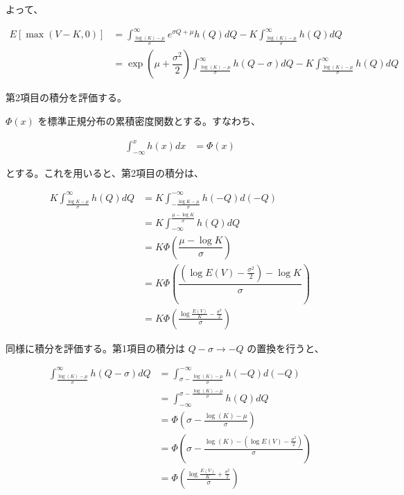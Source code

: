 \documentclass[uplatex]{jsarticle}
\begin{document}
よって、

\begin{align}
	E \left[ \max(V-K,0) \right] & = \int^{\infty}_{\frac{\log(K) - \mu}{\sigma}} e^{\sigma Q + \mu } h(Q) dQ - K \int^{\infty}_{\frac{\log(K) - \mu}{\sigma}} h(Q) dQ                          \\
	                             & = \exp( \mu + \dfrac{\sigma^{2} }{2}) \int^{\infty}_{\frac{\log(K) - \mu}{\sigma}} h(Q - \sigma) dQ - K \int^{\infty}_{\frac{\log(K) - \mu}{\sigma}} h(Q) dQ
\end{align}

第2項目の積分を評価する。

$\Phi (x)$ を標準正規分布の累積密度関数とする。すなわち、

\begin{align}
	\int^{x}_{-\infty} h(x) dx & = \Phi (x)
\end{align}

とする。これを用いると、第2項目の積分は、

\begin{align}
	K \int^{\infty}_{\frac{\log K - \mu}{\sigma}} h(Q) dQ & = K \int_{-\frac{\log K - \mu}{\sigma}}^{-\infty} h(-Q) d(-Q)                                      \\
	                                                      & = K \int^{\frac{ \mu - \log K }{\sigma}}_{-\infty} h(Q) dQ                                         \\
	                                                      & = K \Phi \left( \dfrac{ \mu - \log K }{\sigma} \right)                                             \\
	                                                      & = K \Phi \left( \dfrac{ \left( \log E(V) - \frac{\sigma^{2}}{2} \right) - \log K }{\sigma} \right) \\
	                                                      & = K \Phi \left( \frac{\log\frac{E(V)}{K} - \frac{\sigma^{2}}{2} }{\sigma} \right)
\end{align}

同様に積分を評価する。第1項目の積分は $Q-\sigma \to -Q$ の置換を行うと、

\begin{align}
	\int^{\infty}_{\frac{\log(K) - \mu}{\sigma}} h(Q - \sigma) dQ & = \int^{-\infty}_{\sigma - \frac{\log(K) - \mu}{\sigma}} h(-Q) d(-Q)                                     \\
	                                                              & = \int_{-\infty}^{\sigma - \frac{\log(K) - \mu}{\sigma}} h(Q) dQ                                         \\
	                                                              & = \Phi \left( \sigma - \frac{\log(K) - \mu}{\sigma} \right)                                              \\
	                                                              & = \Phi \left( \sigma - \frac{\log(K) - \left( \log E(V) - \frac{\sigma^{2}}{2} \right) }{\sigma} \right) \\
	                                                              & = \Phi \left( \frac{ \log \frac{E(V)}{K} + \frac{\sigma^{2}}{2} }{\sigma} \right)
\end{align}
\end{document}

